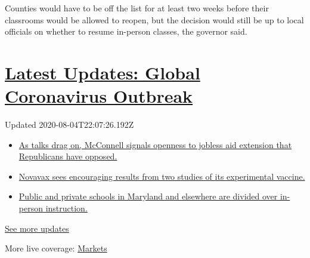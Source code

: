 Counties would have to be off the list for at least two weeks before
their classrooms would be allowed to reopen, but the decision would
still be up to local officials on whether to resume in-person classes,
the governor said.

\hypertarget{latest-updates-global-coronavirus-outbreak}{%
\section{\texorpdfstring{\href{https://www.nytimes3xbfgragh.onion/2020/08/04/world/coronavirus-cases.html?action=click\&pgtype=Article\&state=default\&region=MAIN_CONTENT_1\&context=storylines_live_updates}{Latest
Updates: Global Coronavirus
Outbreak}}{Latest Updates: Global Coronavirus Outbreak}}\label{latest-updates-global-coronavirus-outbreak}}

Updated 2020-08-04T22:07:26.192Z

\begin{itemize}
\tightlist
\item
  \href{https://www.nytimes3xbfgragh.onion/2020/08/04/world/coronavirus-cases.html?action=click\&pgtype=Article\&state=default\&region=MAIN_CONTENT_1\&context=storylines_live_updates\#link-2daa96b5}{As
  talks drag on, McConnell signals openness to jobless aid extension
  that Republicans have opposed.}
\item
  \href{https://www.nytimes3xbfgragh.onion/2020/08/04/world/coronavirus-cases.html?action=click\&pgtype=Article\&state=default\&region=MAIN_CONTENT_1\&context=storylines_live_updates\#link-1228a480}{Novavax
  sees encouraging results from two studies of its experimental
  vaccine.}
\item
  \href{https://www.nytimes3xbfgragh.onion/2020/08/04/world/coronavirus-cases.html?action=click\&pgtype=Article\&state=default\&region=MAIN_CONTENT_1\&context=storylines_live_updates\#link-4825b93}{Public
  and private schools in Maryland and elsewhere are divided over
  in-person instruction.}
\end{itemize}

\href{https://www.nytimes3xbfgragh.onion/2020/08/04/world/coronavirus-cases.html?action=click\&pgtype=Article\&state=default\&region=MAIN_CONTENT_1\&context=storylines_live_updates}{See
more updates}

More live coverage:
\href{https://www.nytimes3xbfgragh.onion/live/2020/08/04/business/stock-market-today-coronavirus?action=click\&pgtype=Article\&state=default\&region=MAIN_CONTENT_1\&context=storylines_live_updates}{Markets}


